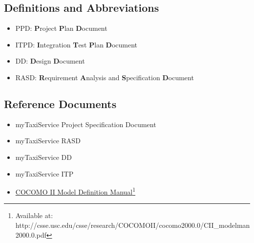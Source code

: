 \subsection{Definitions and Abbreviations}
\begin{itemize}
	\item PPD: \textbf{P}roject \textbf{P}lan \textbf{D}ocument
	\item ITPD: \textbf{I}ntegration \textbf{T}est \textbf{P}lan \textbf{D}ocument
	\item DD: \textbf{D}esign \textbf{D}ocument
	\item RASD: \textbf{R}equirement \textbf{A}nalysis and \textbf{S}pecification \textbf{D}ocument
\end{itemize}
\subsection{Reference Documents}
\begin{itemize}
	\item myTaxiService Project Specification Document
	\item myTaxiService RASD
	\item myTaxiService DD
	\item myTaxiService ITP
	\item \href{http://csse.usc.edu/csse/research/COCOMOII/cocomo2000.0/CII\_modelman2000.0.pdf}{COCOMO II Model Definition Manual}\footnote{Available at: http://csse.usc.edu/csse/research/COCOMOII/cocomo2000.0/CII\_modelman2000.0.pdf}
\end{itemize}